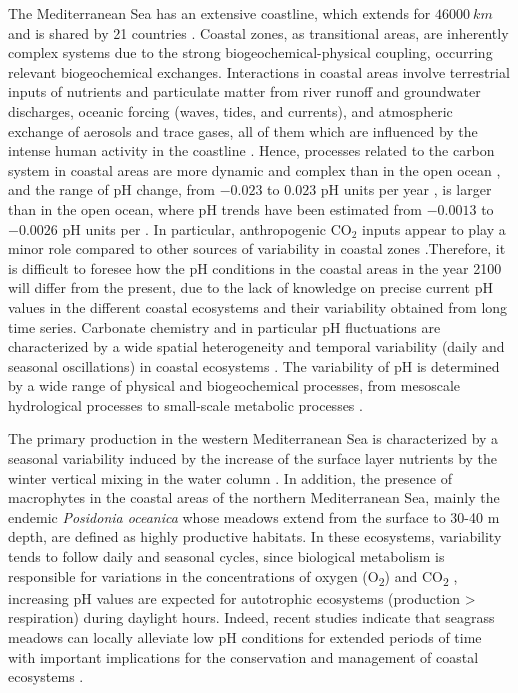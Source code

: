 The Mediterranean Sea has an extensive coastline, which extends for
$\SI{46000}{km}$ and is shared by 21 countries \cite{EEA1999}. Coastal zones,
as transitional areas, are inherently complex systems due to the strong
biogeochemical-physical coupling, occurring relevant biogeochemical exchanges.
Interactions in coastal areas involve terrestrial inputs of nutrients and
particulate matter from river runoff and groundwater discharges, oceanic
forcing (waves, tides, and currents), and atmospheric exchange of aerosols and
trace gases, all of them which are influenced by the intense human activity in
the coastline \cite{crossland2005coastal}. Hence, processes related to the
carbon system in coastal areas are more dynamic and complex than in the open
ocean \cite{Borges2010}, and the range of pH change, from $-0.023$ to
$0.023$ pH units per year \cite{Carstensen2019}, is larger than in the open
ocean, where pH trends have been estimated from $-0.0013$ to $-0.0026$ pH
units per \cite{Bates2014}. In particular, anthropogenic CO$_2$ inputs appear
to play a minor role compared to other sources of variability in coastal
zones \cite{Hofmann2011}.Therefore, it is difficult to foresee how the pH
conditions in the coastal areas in the year 2100 will differ from the present,
due to the lack of knowledge on precise current pH values in the different
coastal ecosystems and their variability obtained from long time series.
Carbonate chemistry and in particular pH fluctuations are characterized by a
wide spatial heterogeneity and temporal variability (daily and seasonal
oscillations) in coastal ecosystems \cite{Hofmann2011,Duarte2013,Mercado2011}.
The variability of pH is determined by a wide range of physical and
biogeochemical processes, from mesoscale hydrological processes to small-scale
metabolic processes \cite{Krause-Jensen2015}.

The primary production in the western Mediterranean Sea is characterized by
a seasonal variability induced by the increase of the surface layer nutrients
by the winter vertical mixing in the water column
\cite{goffredo2013mediterranean}. In addition, the presence of
macrophytes \cite{murphy2019world}in the coastal areas of the northern
Mediterranean Sea, mainly the endemic \emph{Posidonia oceanica} whose meadows
extend from the surface to 30-40 m depth, are defined as highly productive
habitats. In these ecosystems, variability tends to follow daily and seasonal
cycles, since biological metabolism is responsible for variations in the
concentrations of oxygen (O\textsubscript{2}) and CO\textsubscript{2}
\cite{Duarte2013,Hendriks2014}, increasing pH values are expected for
autotrophic ecosystems (production > respiration) during daylight hours.
Indeed, recent studies indicate that seagrass meadows can locally alleviate low
pH conditions for extended periods of time with important implications for the
conservation and management of coastal ecosystems  \cite{Ricart2021}.

